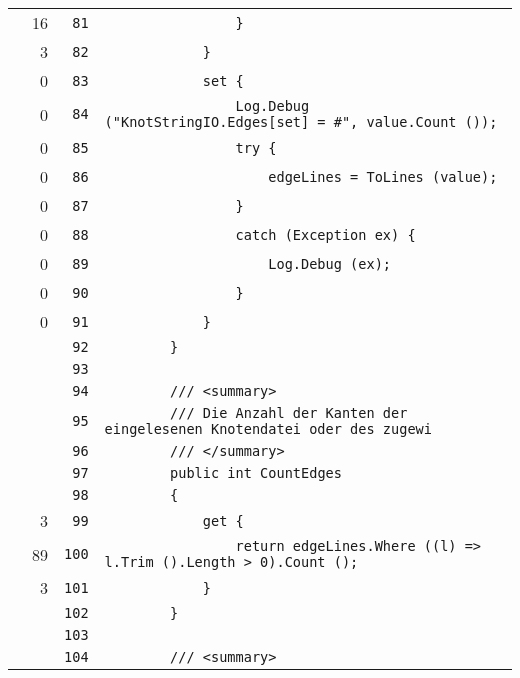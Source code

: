 \documentclass[a4paper,10pt]{article}
\begin{document}
\begin{longtable}[l]{lrrl}
\cellcolor{green} & 16 & \verb~81~ & \verb~                }~\\
\cellcolor{green} & 3 & \verb~82~ & \verb~            }~\\
\cellcolor{red} & 0 & \verb~83~ & \verb~            set {~\\
\cellcolor{red} & 0 & \verb~84~ & \verb~                Log.Debug ("KnotStringIO.Edges[set] = #", value.Count ());~\\
\cellcolor{red} & 0 & \verb~85~ & \verb~                try {~\\
\cellcolor{red} & 0 & \verb~86~ & \verb~                    edgeLines = ToLines (value);~\\
\cellcolor{red} & 0 & \verb~87~ & \verb~                }~\\
\cellcolor{red} & 0 & \verb~88~ & \verb~                catch (Exception ex) {~\\
\cellcolor{red} & 0 & \verb~89~ & \verb~                    Log.Debug (ex);~\\
\cellcolor{red} & 0 & \verb~90~ & \verb~                }~\\
\cellcolor{red} & 0 & \verb~91~ & \verb~            }~\\
\cellcolor{gray} &  & \verb~92~ & \verb~        }~\\
\cellcolor{gray} &  & \verb~93~ & \verb~~\\
\cellcolor{gray} &  & \verb~94~ & \verb~        /// <summary>~\\
\cellcolor{gray} &  & \verb~95~ & \verb~        /// Die Anzahl der Kanten der eingelesenen Knotendatei oder des zugewi~\\
\cellcolor{gray} &  & \verb~96~ & \verb~        /// </summary>~\\
\cellcolor{gray} &  & \verb~97~ & \verb~        public int CountEdges~\\
\cellcolor{gray} &  & \verb~98~ & \verb~        {~\\
\cellcolor{green} & 3 & \verb~99~ & \verb~            get {~\\
\cellcolor{green} & 89 & \verb~100~ & \verb~                return edgeLines.Where ((l) => l.Trim ().Length > 0).Count ();~\\
\cellcolor{green} & 3 & \verb~101~ & \verb~            }~\\
\cellcolor{gray} &  & \verb~102~ & \verb~        }~\\
\cellcolor{gray} &  & \verb~103~ & \verb~~\\
\cellcolor{gray} &  & \verb~104~ & \verb~        /// <summary>~\\

\end{longtable}
\end{document}
